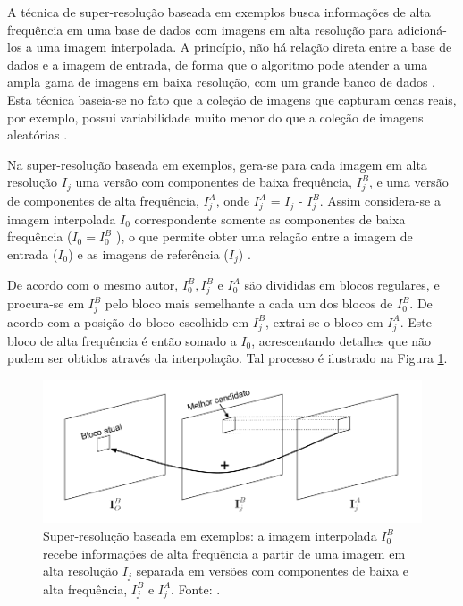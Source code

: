 A técnica de super-resolução baseada em exemplos busca informações de alta frequência em uma base de dados com imagens em alta resolução para adicioná-los a uma imagem interpolada. A princípio, não há relação direta entre a base de dados e a imagem de entrada, de forma que o algoritmo pode atender a uma ampla gama de imagens em baixa resolução, com um grande banco de dados \cite{freeman2002example}. Esta técnica baseia-se no fato que a coleção de imagens que capturam cenas reais, por exemplo, possui variabilidade muito menor do que a coleção de imagens aleatórias \cite{garcia2013tecnicas}.

Na super-resolução baseada em exemplos, gera-se para cada imagem em alta resolução $I_j$ uma versão com componentes de baixa frequência, $I_j^B$, e uma versão de componentes de alta frequência, $I_j^A$, onde $I_j^A$ = $I_j$ - $I_j^B$. Assim considera-se a imagem interpolada $I_0$ correspondente somente as componentes de baixa frequência ($I_0 = I_0^B$ ), o que permite obter uma relação entre a imagem de entrada ($I_0$) e as imagens de referência ($I_j$) \cite{garcia2013tecnicas}.

De acordo com o mesmo autor, $I_0^B, I_j^B$ e $I_0^A$ são divididas em blocos regulares, e procura-se em $I^B_j$ pelo bloco mais semelhante a cada um dos blocos de $I_0^B$. De acordo com a posição do bloco escolhido em $I_j^B$, extrai-se o bloco em $I_j^A$. Este bloco de alta frequência é então somado a $I_0$, acrescentando detalhes que não pudem ser obtidos através da interpolação. Tal processo é ilustrado na Figura \ref{fig:SR_4}.

\begin{figure}[h]
	\centering
	\includegraphics[scale=0.50]{figuras/superresolucao_4.png}
	\caption{Super-resolução baseada em exemplos: a imagem interpolada $I_0^B$ recebe informações de alta frequência a partir de uma imagem em alta resolução $I_j$ separada em versões com componentes de baixa e alta frequência, $I_j^B$ e $I_j^A$. Fonte: \cite{garcia2013tecnicas}.}

	\label{fig:SR_4}
\end{figure}

